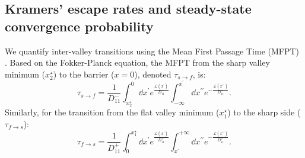 \documentclass[aps,prx,reprint,superscriptaddress,longbibliography,nofootinbib,floatfix]{revtex4-2}
\begin{document}
\subsection{Kramers' escape rates and steady-state convergence probability} \label{sec:appendix3}

We quantify inter-valley transitions using the Mean First Passage Time (MFPT) \cite{gardiner2009stochastic}. Based on the Fokker-Planck equation, the MFPT from the sharp valley minimum ($x_2^{\star}$) to the barrier ($x=0$), denoted $\tau_{s \to f}$, is:
\begin{equation} \label{eq:MFPT_left}
    \tau_{s \to f} = \frac{1}{D_{11}^-} \int_{x_2^{\star}}^{0} \dd x^{\prime} e^{\frac{\mathcal{L}(x^{\prime})}{D_{11}^-}} \int_{-\infty}^{x^{\prime}} \dd x^{\prime\prime} e^{-\frac{\mathcal{L}(x^{\prime\prime})}{D_{11}^-}}.
\end{equation}
Similarly, for the transition from the flat valley minimum ($x_1^{\star}$) to the sharp side ($\tau_{f \to s}$):
\begin{equation} \label{eq:MFPT_right}
    \tau_{f \to s} = \frac{1}{D_{11}^+} \int_{0}^{x_1^{\star}} \dd x^{\prime} e^{\frac{\mathcal{L}(x^{\prime})}{D_{11}^+}} \int_{x^{\prime}}^{+\infty} \dd x^{\prime\prime} e^{-\frac{\mathcal{L}(x^{\prime\prime})}{D_{11}^+}}.
\end{equation}
\end{document}
